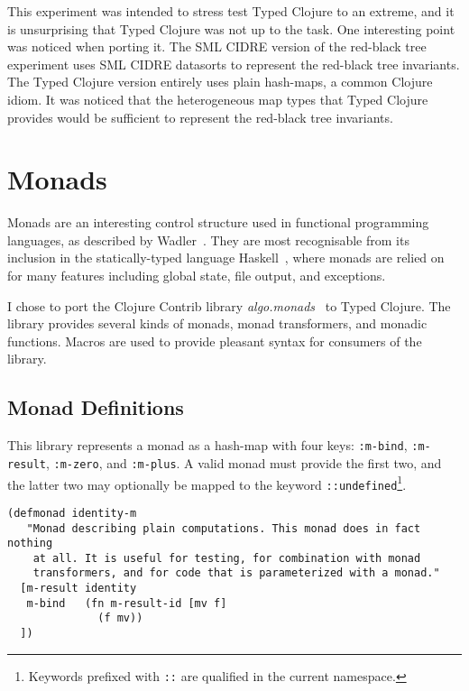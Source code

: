 This experiment was intended to stress test Typed Clojure to an extreme, and
it is unsurprising that Typed Clojure was not up to the task.
One interesting point was noticed when porting it.
The SML CIDRE version of the red-black tree experiment
uses SML CIDRE datasorts to represent the red-black tree invariants.
The Typed Clojure version entirely uses plain hash-maps, a common Clojure idiom.
It was noticed that the heterogeneous map types that Typed Clojure provides would be sufficient to
represent the red-black tree invariants.

\section{Monads}
\label{sec:monads}

Monads are an interesting control structure used in functional programming languages,
as described by Wadler~\cite{Wad95}.
They are most recognisable from its inclusion in the statically-typed language Haskell~\cite{Mar10},
where monads are relied on for many features including global state, file output, and exceptions.

I chose to port the Clojure Contrib library \emph{algo.monads}~\cite{Hic12} to Typed Clojure. The library
provides several kinds of monads, monad transformers, and monadic functions.
Macros are used to provide pleasant syntax for consumers of the library.

\subsection{Monad Definitions}
\label{sec:monaddef}

This library represents a monad as a hash-map with four keys: \lstinline|:m-bind|, \lstinline|:m-result|,
\lstinline|:m-zero|, and \lstinline|:m-plus|. A valid monad must provide the first two, and the latter
two may optionally be mapped to the keyword \lstinline|::undefined|\footnote{Keywords prefixed with \lstinline|::|
are qualified in the current namespace.}.

\begin{lstlisting}[caption=Untyped definition for the identity monad, label=lst:identitymdef]
(defmonad identity-m
   "Monad describing plain computations. This monad does in fact nothing
    at all. It is useful for testing, for combination with monad
    transformers, and for code that is parameterized with a monad."
  [m-result identity
   m-bind   (fn m-result-id [mv f]
              (f mv))
  ])
\end{lstlisting}

